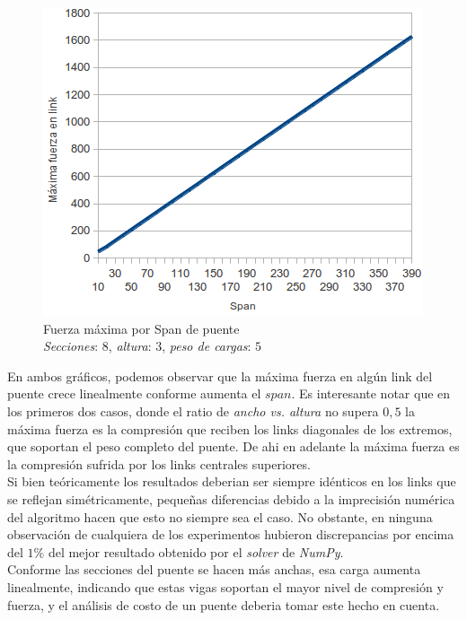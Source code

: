 \begin{figure}[h!]
	\begin{center}
	\includegraphics[scale=0.8]{archivos/graficos/Fuerza-x-span2.png}
	\caption{\label{fig:fuerza_x_span2}Fuerza máxima por Span de puente\\  		\textit{Secciones}: $8$, \textit{altura}: $3$, \textit{peso de cargas}: $5$}
	\end{center}
\end{figure}

En ambos gráficos, podemos observar que la máxima fuerza en algún link del puente crece linealmente conforme aumenta el $span$. Es interesante notar que en los primeros dos casos, donde el ratio de \textit{ancho vs. altura} no supera $0,5$ la máxima fuerza es la compresión que reciben los links diagonales de los extremos, que soportan el peso completo del puente. De ahi en adelante la máxima fuerza es la compresión sufrida por los links centrales superiores.\\

Si bien teóricamente los resultados deberian ser siempre idénticos en los links
que se reflejan simétricamente, pequeñas diferencias debido a la imprecisión 
numérica del algoritmo hacen que esto no siempre sea el caso. No obstante,
en ninguna observación de cualquiera de los experimentos hubieron discrepancias
por encima del $1\%$ del mejor resultado obtenido por el \textit{solver} de \textit{NumPy}.\\

Conforme las secciones del puente se hacen más anchas, esa carga aumenta linealmente, indicando que estas vigas soportan el mayor nivel de compresión y fuerza, y el análisis de costo de un puente deberia tomar este hecho en cuenta.


